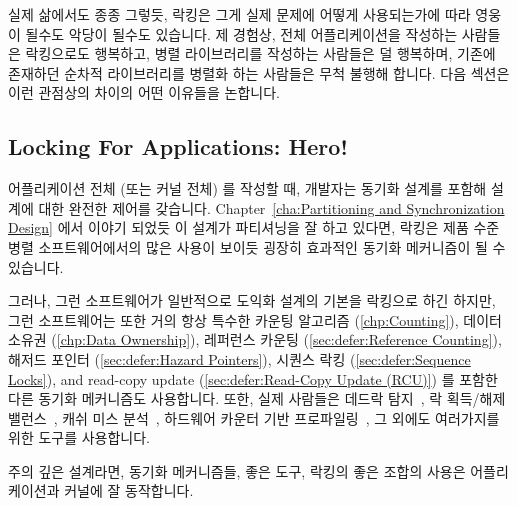 실제 삶에서도 종종 그렇듯, 락킹은 그게 실제 문제에 어떻게 사용되는가에 따라
영웅이 될수도 악당이 될수도 있습니다.
제 경험상, 전체 어플리케이션을 작성하는 사람들은 락킹으로도 행복하고, 병렬
라이브러리를 작성하는 사람들은 덜 행복하며, 기존에 존재하던 순차적 라이브러리를
병렬화 하는 사람들은 무척 불행해 합니다.
다음 섹션은 이런 관점상의 차이의 어떤 이유들을 논합니다.

\subsection{Locking For Applications: Hero!}
\label{sec:locking:Locking For Applications: Hero!}

어플리케이션 전체 (또는 커널 전체) 를 작성할 때, 개발자는 동기화 설계를 포함해
설계에 대한 완전한 제어를 갖습니다.
Chapter~\ref{cha:Partitioning and Synchronization Design} 에서 이야기 되었듯 이
설계가 파티셔닝을 잘 하고 있다면, 락킹은 제품 수준 병렬 소프트웨어에서의 많은
사용이 보이듯 굉장히 효과적인 동기화 메커니즘이 될 수 있습니다.

그러나, 그런 소프트웨어가 일반적으로 도익화 설계의 기본을 락킹으로 하긴 하지만,
그런 소프트웨어는 또한 거의 항상 특수한 카운팅 알고리즘 (\cref{chp:Counting}),
데이터 소유권 (\cref{chp:Data Ownership}),
레퍼런스 카운팅 (\cref{sec:defer:Reference Counting}),
해저드 포인터 (\cref{sec:defer:Hazard Pointers}),
시퀀스 락킹 (\cref{sec:defer:Sequence Locks}), and
read-copy update (\cref{sec:defer:Read-Copy Update (RCU)})
를 포함한 다른 동기화 메커니즘도 사용합니다.
또한, 실제 사람들은 데드락 탐지~\cite{JonathanCorbet2006lockdep}, 락 획득/해제
밸런스~\cite{JonathanCorbet2004sparse}, 캐쉬 미스 분석~\cite{ValgrindHomePage},
하드웨어 카운터 기반 프로파일링~\cite{LinuxKernelPerfWiki,OProfileHomePage}, 그
외에도 여러가지를 위한 도구를 사용합니다.

주의 깊은 설계라면, 동기화 메커니즘들, 좋은 도구, 락킹의 좋은 조합의 사용은
어플리케이션과 커널에 잘 동작합니다.

\iffalse

